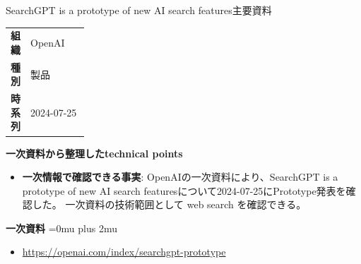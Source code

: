 \begin{technicalnote}{SearchGPT is a prototype of new AI search features}{主要資料}
\begingroup
\begin{tabularx}{\linewidth}{@{}>{\bfseries}p{0.22\linewidth}X@{}}
組織 & OpenAI \\
種別 & 製品 \\
時系列 & 2024-07-25 \\
\end{tabularx}
\smallskip
{\bfseries 一次資料から整理したtechnical points}
\begin{itemize}[leftmargin=1.5em,itemsep=0.35em]
\item \textbf{一次情報で確認できる事実}: OpenAIの一次資料により、SearchGPT is a prototype of new AI search featuresについて2024-07-25にPrototype発表を確認した。 一次資料の技術範囲として web search を確認できる。
\end{itemize}
\begin{minipage}{\linewidth}
\begin{samepage}
{\bfseries 一次資料}
\begingroup\sloppy
\Urlmuskip=0mu plus 2mu\relax
\begin{itemize}[leftmargin=1.5em,itemsep=0.25em]
\item {\scriptsize\url{https://openai.com/index/searchgpt-prototype}}
\end{itemize}
\endgroup
\end{samepage}
\end{minipage}
\endgroup
\end{technicalnote}
\medskip

